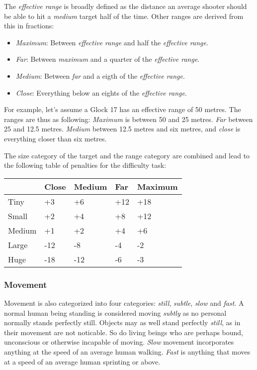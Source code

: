 The \emph{effective range} is broadly defined as the distance an average shooter
should be able to hit a \emph{medium} target half of the time. Other ranges are
derived from this in fractions:

\begin{itemize}
\item \emph{Maximum}: Between \emph{effective range} and half the
  \emph{effective range}.
\item \emph{Far}: Between \emph{maximum} and a quarter of the
  \emph{effective range}.
\item \emph{Medium}: Between \emph{far} and a eigth of the
  \emph{effective range}.
\item \emph{Close}: Everything below an eights of the \emph{effective range}.
\end{itemize}

For example, let's assume a Glock 17 has an effective range of 50
metres. The ranges are thus as following: \emph{Maximum} is between 50
and 25 metres. \emph{Far} between 25 and 12.5 metres. \emph{Medium}
between 12.5 metres and six metres, and \emph{close} is everything
closer than six metres.

The size category of the target and the range category are combined and lead
to the following table of penalties for the difficulty task:

\begin{center}
  \begin{tabular}{| l | l | l | l | l |}
    \hline
    \,        & Close & Medium & Far & Maximum \\ \hline
    Tiny      & +3    & +6     & +12 & +18    \\ \hline
    Small     & +2    & +4     & +8  & +12    \\ \hline
    Medium    & +1    & +2     & +4  & +6     \\ \hline
    Large     & -12   & -8     & -4  & -2     \\ \hline
    Huge      & -18   & -12    & -6  & -3     \\
    \hline
  \end{tabular}
\end{center}

\subsubsection{Movement}

Movement is also categorized into four categories: \emph{still}, \emph{subtle},
\emph{slow} and \emph{fast}. A normal human being standing is considered
moving \emph{subtly} as no personal normally stands perfectly still. Objects
may as well stand perfectly \emph{still}, as in their movement are not
noticable. So do living beings who are perhaps bound, unconscious or otherwise
incapable of moving. \emph{Slow} movement incorporates anything at the speed
of an average human walking. \emph{Fast} is anything that moves at a speed of
an average human sprinting or above.

